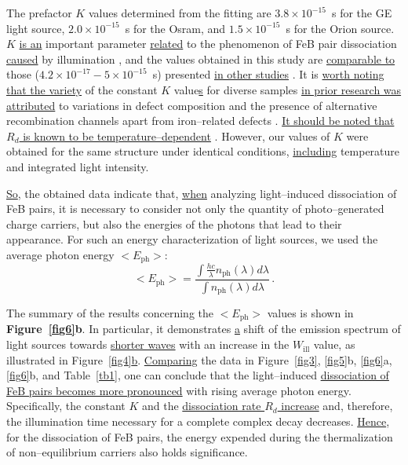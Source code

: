 \documentclass{WileyMSP-template}
\begin{document}
The prefactor $K$ values determined from the fitting are
$3.8\times10^{-15}$~s for the GE light source,
$2.0\times10^{-15}$~s for the Osram, and
$1.5\times10^{-15}$~s for the Orion source.
$K$ \textcolor[rgb]{0.00,0.07,1.00}{\uline{is an}} important parameter \textcolor[rgb]{0.00,0.07,1.00}{\uline{related}} to the phenomenon of FeB pair dissociation \textcolor[rgb]{0.00,0.07,1.00}{\uline{caused}} by illumination \cite{FeBKin2019},
and the values obtained in this study are \textcolor[rgb]{0.00,0.07,1.00}{\uline{comparable to}} those ($4.2\times10^{-17}-5\times10^{-15}$~s) presented \textcolor[rgb]{0.00,0.07,1.00}{\uline{in other studies}} \cite{FeBLight2,FeBAssJAP2014,FeBKin2019}.
It is \textcolor[rgb]{0.00,0.07,1.00}{\uline{worth noting that the variety}} of the constant $K$ value\textcolor[rgb]{0.00,0.07,1.00}{\uline{s}} for diverse samples
\textcolor[rgb]{0.00,0.07,1.00}{\uline{in prior research was attributed}}
to variations in defect composition and the presence of alternative recombination channels apart from iron--related defects \cite{FeBLight2,FeBAssJAP2014}.
\textcolor[rgb]{0.00,0.07,1.00}{\uline{It should be noted that $R_d$ is known to be temperature--dependent}} \cite{Lagowskii1993}.
However, our values of $K$ were obtained for the same structure under identical conditions, \textcolor[rgb]{0.00,0.07,1.00}{\uline{including}} temperature and integrated light intensity.

\textcolor[rgb]{0.00,0.07,1.00}{\uline{So}}, the obtained data indicate that, \textcolor[rgb]{0.00,0.07,1.00}{\uline{when}} analyzing light--induced dissociation of FeB pairs,
it is necessary to consider not only the quantity of photo--generated charge carriers,
but also the energies of the photons that lead to their appearance.
For such an energy characterization of light sources, we used the average photon energy $<E_\mathrm{ph}>$:
\begin{equation}
\label{eqEaver}
<E_\mathrm{ph}>=\frac{\int \frac{hc}{\lambda}n_\mathrm{ph}(\lambda)d\lambda}{\int n_\mathrm{ph}(\lambda)d\lambda}\,.
\end{equation}


The summary of the results concerning the $<E_\mathrm{ph}>$ values is shown in \textbf{Figure~\ref{fig6}b}.
In particular, it demonstrates \textcolor[rgb]{0.00,0.07,1.00}{\uline{a}} shift of the emission spectrum of light sources
towards \textcolor[rgb]{0.00,0.07,1.00}{\uline{shorter waves}} with an increase in the $W_\mathrm{ill}$ value, as illustrated in Figure~\ref{fig4}\textcolor[rgb]{0.00,0.07,1.00}{\uline{b}}.
\textcolor[rgb]{0.00,0.07,1.00}{\uline{Comparing}} the data in Figure~\ref{fig3}, \ref{fig5}b, \ref{fig6}a, \ref{fig6}b, and Table~\ref{tb1}, one can conclude that
the light--induced \textcolor[rgb]{0.00,0.07,1.00}{\uline{dissociation of FeB pairs becomes more pronounced}} with rising average photon energy.
Specifically, the constant $K$ and the \textcolor[rgb]{0.00,0.07,1.00}{\uline{dissociation rate $R_d$ increase}} and, therefore, the illumination time necessary for a complete complex decay decreases.
\textcolor[rgb]{0.00,0.07,1.00}{\uline{Hence}}, for the dissociation of FeB pairs, the energy expended during the thermalization of non--equilibrium carriers also holds significance.
\end{document}
